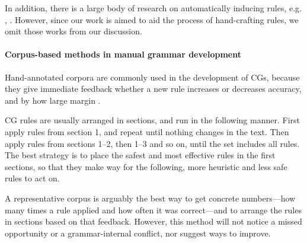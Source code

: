 In addition, there is a large body of research on automatically inducing rules, e.g. \cite{inducing_cg1996}, \cite{lindberg_eineborg98ilp}
. However, since our work is aimed to aid the process of hand-crafting rules, we omit those works from our discussion.


\paragraph{Corpus-based methods in manual grammar development}

Hand-annotated corpora are commonly used in the development of CGs, because they give immediate feedback whether a new rule increases or decreases accuracy, and by how large margin \cite{voutilainen2004}.

CG rules are usually arranged in sections, and run in the following manner. 
First apply rules from section 1, and repeat until nothing changes in the text. Then apply rules from sections 1--2, then 1--3 and so on, until the set includes all rules.
The best strategy is to place the safest and most effective rules in the first sections,
so that they make way for the following, more heuristic and less safe rules to act on.

A representative corpus is arguably the best way to get concrete numbers---how many times a rule applied and how often it was correct---and to arrange the rules in sections based on that feedback.
However, this method will not notice a missed opportunity or a grammar-internal conflict, nor suggest ways to improve.





